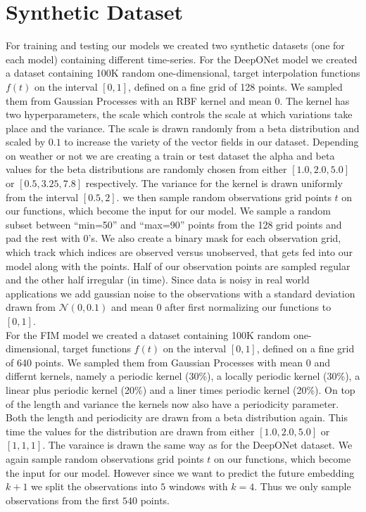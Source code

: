 \documentclass{article}
\theoremstyle{plain}
\theoremstyle{definition}
\theoremstyle{remark}
\begin{document}
\section{Synthetic Dataset}
For training and testing our models we created two synthetic datasets (one for each model) containing different time-series.
For the DeepONet model we created a dataset containing 100K random one-dimensional, target interpolation functions $f(t)$ on the interval $[0, 1]$, defined on a fine grid of 128 points.
We sampled them from Gaussian Processes with an RBF kernel and mean $0$. The kernel has two hyperparameters, the scale which controls the scale at which variations take place and the variance.
The scale is drawn randomly from a beta distribution and scaled by $0.1$ to increase the variety of the vector fields in our dataset.
Depending on weather or not we are creating a train or test dataset the alpha and beta values for the beta distributions are randomly chosen from either $[1.0,2.0,5.0]$ or $[0.5,3.25,7.8]$ respectively. The variance for the kernel is drawn uniformly from the interval $[0.5, 2]$.
we then sample random observations grid points $t$ on our functions, which become the input for our model. We sample a random subset between “min=50” and “max=90” points from the 128 grid points and pad the rest with $0$'s. We also create a binary mask for each observation grid, which track which indices are observed versus unobserved, that gets fed into our model along with the points.
Half of our observation points are sampled regular and the other half irregular (in time). Since data is noisy in real world applications we add gaussian noise to the observations with a standard deviation drawn from $\mathcal{N}(0, 0.1)$ and mean $0$ after first normalizing our functions to $[0,1]$.\\
For the FIM model we created a dataset containing 100K random one-dimensional, target functions $f(t)$ on the interval $[0, 1]$, defined on a fine grid of 640 points.
We sampled them from Gaussian Processes with mean $0$ and differnt kernels, namely a periodic kernel (30\%), a locally periodic kernel (30\%), a linear plus periodic kernel (20\%)  and a liner times periodic kernel (20\%).
On top of the length and variance the kernels now also have a periodicity parameter. Both the length and periodicity are drawn from a beta distribution again. This time the values for the distribution are drawn from either $[1.0,2.0,5.0]$ or $[1,1,1]$.
The varaince is drawn the same way as for the DeepONet dataset. We again sample random observations grid points $t$ on our functions, which become the input for our model. However since we want to predict the future embedding $k+1$ we split the observations into $5$ windows with $k=4$. Thus we only sample observations from the first $540$ points.
\end{document}
